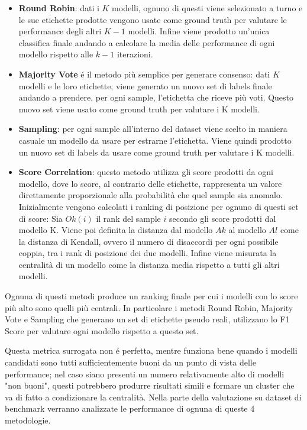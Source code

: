 \begin{itemize}
	\item \textbf{Round Robin}: dati i $K$ modelli, ognuno di questi viene selezionato a turno e le sue etichette prodotte vengono usate come ground truth per valutare le performance degli altri $K-1$ modelli. Infine viene prodotto un'unica classifica finale andando a calcolare la media delle performance di ogni modello rispetto alle $k-1$ iterazioni. 
	\item \textbf{Majority Vote} é il metodo più semplice per generare consenso: dati $K$ modelli e le loro etichette, viene generato un nuovo set di labels finale andando a prendere, per ogni sample, l'etichetta che riceve più voti. Questo nuovo set viene usato come ground truth per valutare i K modelli.
	\item \textbf{Sampling}: per ogni sample all'interno del dataset viene scelto in maniera casuale un modello da usare per estrarne l'etichetta. Viene quindi prodotto un nuovo set di labels da usare come ground truth per valutare i K modelli.
	\item \textbf{Score Correlation}: questo metodo utilizza gli score prodotti da ogni modello, dove lo score, al contrario delle etichette, rappresenta un valore direttamente proporzionale alla probabilità che quel sample sia anomalo. Inizialmente vengono calcolati i ranking di posizione per ognuno di questi set di score: Sia $Ok(i)$ il rank del sample $i$ secondo gli score prodotti dal modello K. Viene poi definita la distanza dal modello $Ak$ al modello $Al$ come la distanza di Kendall, ovvero il numero di disaccordi per ogni possibile coppia, tra i rank di posizione dei due modelli. Infine viene misurata la centralità di un modello come la distanza media rispetto a tutti gli altri modelli.
\end{itemize}

Ognuna di questi metodi produce un ranking finale per cui i modelli con lo score più alto sono quelli più centrali. In particolare i metodi Round Robin, Majority Vote e Sampling che generano un set di etichette pseudo reali, utilizzano lo F1 Score per valutare ogni modello rispetto a questo set.

Questa metrica surrogata non é perfetta, mentre funziona bene quando i modelli candidati sono tutti sufficientemente buoni da un punto di vista delle performance; nel caso siano presenti un numero relativamente alto di modelli "non buoni", questi potrebbero produrre risultati simili e formare un cluster che va di fatto a condizionare la centralità.
Nella parte della valutazione su dataset di benchmark verranno analizzate le performance di ognuna di queste 4 metodologie.


